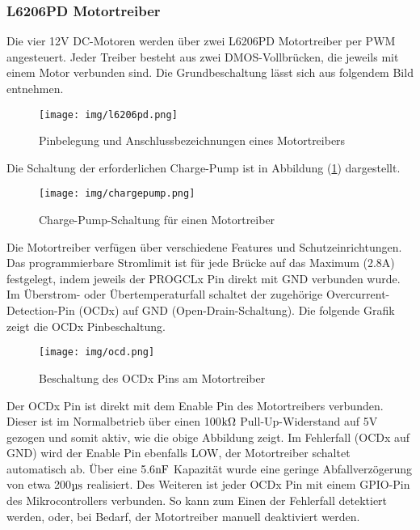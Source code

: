 \documentclass[12pt, a4paper]{report}
\begin{document}
            \subsubsection{L6206PD Motortreiber}\label{l6206pd}
            Die vier 12V DC-Motoren werden über zwei L6206PD Motortreiber per PWM angesteuert. Jeder Treiber besteht aus zwei DMOS-Vollbrücken, die jeweils mit einem Motor verbunden sind. Die Grundbeschaltung lässt sich aus folgendem Bild entnehmen.
            \begin{figure}[H]
               \centering
               \texttt{[image: img/l6206pd.png]}
               \caption{Pinbelegung und Anschlussbezeichnungen eines Motortreibers}
            \end{figure}
            Die Schaltung der erforderlichen Charge-Pump ist in Abbildung (\ref{chargepump-img}) dargestellt.
            \begin{figure}[H]
               \centering
               \texttt{[image: img/chargepump.png]}
               \caption{Charge-Pump-Schaltung für einen Motortreiber}\label{chargepump-img}
            \end{figure}
            Die Motortreiber verfügen über verschiedene Features und Schutzeinrichtungen. Das programmierbare Stromlimit ist für jede Brücke auf das Maximum (2.8A) festgelegt, indem jeweils der PROGCLx Pin direkt mit GND verbunden wurde.
            Im Überstrom- oder Übertemperaturfall schaltet der zugehörige Overcurrent-Detection-Pin (OCDx) auf GND (Open-Drain-Schaltung). Die folgende Grafik zeigt die OCDx Pinbeschaltung.
            \begin{figure}[H]
               \centering
               \texttt{[image: img/ocd.png]}
               \caption{Beschaltung des OCDx Pins am Motortreiber}
            \end{figure}
            Der OCDx Pin ist direkt mit dem Enable Pin des Motortreibers verbunden. Dieser ist im Normalbetrieb über einen 100$\si[]{\kilo\ohm}$ Pull-Up-Widerstand auf 5V gezogen und somit aktiv, wie die obige Abbildung zeigt.
            Im Fehlerfall (OCDx auf GND) wird der Enable Pin ebenfalls LOW, der Motortreiber schaltet automatisch ab. Über eine 5.6$\si[]{\nano\farad}$ Kapazität wurde eine geringe Abfallverzögerung von etwa 200$\si[]{\micro\second}$ realisiert.
            Des Weiteren ist jeder OCDx Pin mit einem GPIO-Pin des Mikrocontrollers verbunden. So kann zum Einen der Fehlerfall detektiert werden, oder, bei Bedarf, der Motortreiber manuell deaktiviert werden.
\end{document}
